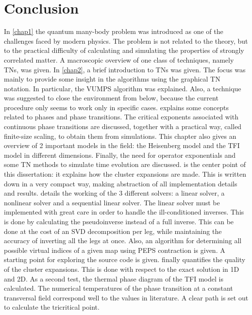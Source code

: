 \section{Conclusion}

In \cref{chap1} the quantum many-body problem was introduced as one of the challenges faced by modern physics. The problem is not related to the theory, but to the practical difficulty of calculating and simulating the properties of strongly correlated matter. A macroscopic overview of one class of techniques, namely \Glspl{TN}, was given.
In \cref{chap2}, a brief introduction to \Glspl{TN} was given. The focus was mainly to provide some insight in the algorithms using the graphical \Gls{TN} notation. In particular, the \Gls{VUMPS} algorithm was explained. Also, a technique was suggested to close the environment from below, because the current procedure only seems to work only in specific cases.
 explains some concepts related to phases and phase transitions. The critical exponents associated with continuous phase transitions are discussed, together with a practical way, called finite-size scaling, to obtain them from simulations. This chapter also gives an overview of 2 important models in the field: the Heisenberg model and the \Gls{TFI} model in different dimensions. Finally, the need for operator exponentials and some \Gls{TN} methods to simulate time evolution are discussed.
 is the center point of this dissertation: it explains how the cluster expansions are made. This is written down in a very compact way, making abstraction of all implementation details and results.
 details the working of the 3 different solvers: a linear solver, a nonlinear solver and a sequential linear solver. The linear solver must be implemented with great care in order to handle the ill-conditioned inverses. This is done by calculating the pseudoinverse instead of a full inverse. This can be done at the cost of an \Gls{SVD} decomposition per leg, while maintaining the accuracy of inverting all the legs at once. Also, an algorithm for determining all possible virtual indices of a given map using \Gls{PEPS} contraction is given.  A starting point for exploring the source code is given.
 finally quantifies the quality of the cluster expansions. This is done with respect to the exact solution in 1D and 2D. As a second test, the thermal phase diagram of the \Gls{TFI} model is calculated. The numerical temperatures of the phase transition at a constant transversal field correspond well to the values in literature. A clear path is set out to calculate the tricritical point.

